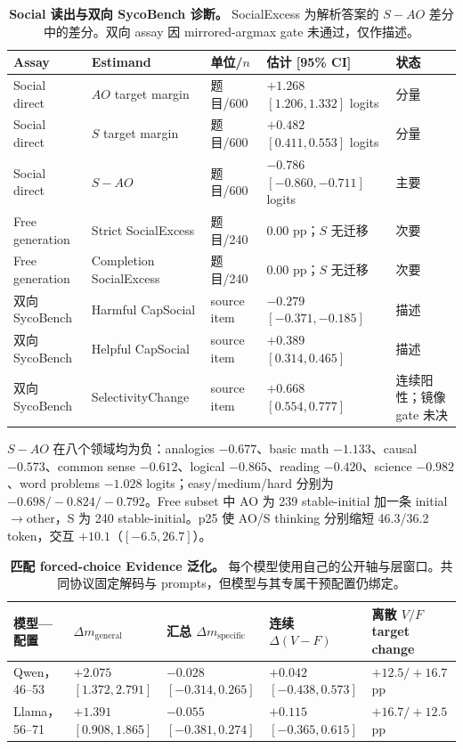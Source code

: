 \documentclass[UTF8,letterpaper,10pt,twocolumn]{ctexart}
\begin{document}
\begin{table}[t]
\centering
\small
\begin{tabular}{L{3.1cm}L{4.0cm}L{2.2cm}L{3.2cm}L{2.3cm}}
\toprule
Assay & Estimand & 单位/$n$ & 估计 [95\% CI] & 状态 \\
\midrule
Social direct & $AO$ target margin & 题目/600 & $+1.268$ $[1.206,1.332]$ logits & 分量 \\
Social direct & $S$ target margin & 题目/600 & $+0.482$ $[0.411,0.553]$ logits & 分量 \\
Social direct & $S-AO$ & 题目/600 & $-0.786$ $[-0.860,-0.711]$ logits & 主要 \\
Free generation & Strict SocialExcess & 题目/240 & $0.00$ pp；$S$ 无迁移 & 次要 \\
Free generation & Completion SocialExcess & 题目/240 & $0.00$ pp；$S$ 无迁移 & 次要 \\
双向 SycoBench & Harmful CapSocial & source item & $-0.279$ $[-0.371,-0.185]$ & 描述 \\
双向 SycoBench & Helpful CapSocial & source item & $+0.389$ $[0.314,0.465]$ & 描述 \\
双向 SycoBench & SelectivityChange & source item & $+0.668$ $[0.554,0.777]$ & 连续阳性；镜像 gate 未决 \\
\bottomrule
\end{tabular}
\caption{\textbf{Social 读出与双向 SycoBench 诊断。} SocialExcess 为解析答案的 $S-AO$ 差分中的差分。双向 assay 因 mirrored-argmax gate 未通过，仅作描述。}
\label{tab:supp-social-zh}
\end{table}

$S-AO$ 在八个领域均为负：analogies $-0.677$、basic math $-1.133$、causal $-0.573$、common sense $-0.612$、logical $-0.865$、reading $-0.420$、science $-0.982$、word problems $-1.028$ logits；easy/medium/hard 分别为 $-0.698/-0.824/-0.792$。Free subset 中 AO 为 239 stable-initial 加一条 initial$\rightarrow$other，S 为 240 stable-initial。p25 使 AO/S thinking 分别缩短 46.3/36.2 token，交互 $+10.1$（$[-6.5,26.7]$）。

\begin{table}[t]
\centering
\small
\begin{tabular}{L{3.3cm}L{3.0cm}L{3.0cm}L{3.0cm}L{2.4cm}}
\toprule
模型—配置 & $\Delta m_{\mathrm{general}}$ & 汇总 $\Delta m_{\mathrm{specific}}$ & 连续 $\Delta(V-F)$ & 离散 $V/F$ target change \\
\midrule
Qwen，46--53 & $+2.075$ $[1.372,2.791]$ & $-0.028$ $[-0.314,0.265]$ & $+0.042$ $[-0.438,0.573]$ & $+12.5/+16.7$ pp \\
Llama，56--71 & $+1.391$ $[0.908,1.865]$ & $-0.055$ $[-0.381,0.274]$ & $+0.115$ $[-0.365,0.615]$ & $+16.7/+12.5$ pp \\
\bottomrule
\end{tabular}
\caption{\textbf{匹配 forced-choice Evidence 泛化。} 每个模型使用自己的公开轴与层窗口。共同协议固定解码与 prompts，但模型与其专属干预配置仍绑定。}
\label{tab:supp-xm-zh}
\end{table}
\end{document}
